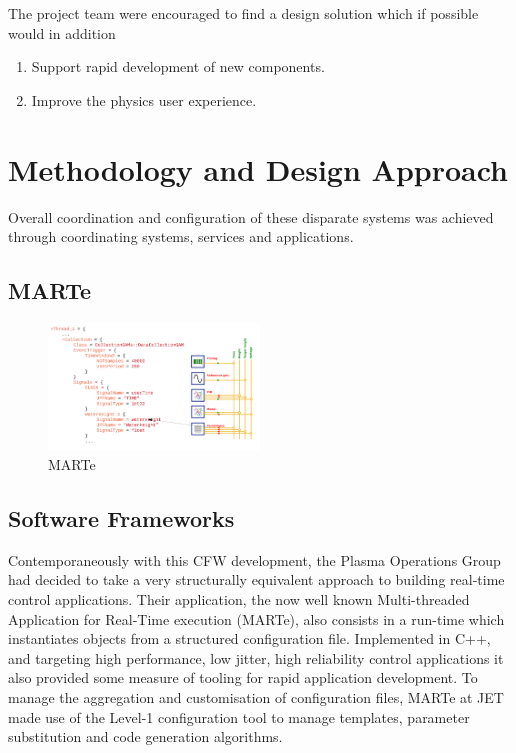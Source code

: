\documentclass[5p]{elsarticle}
\begin{document}
The project team were encouraged to find a design solution which
if possible would in addition

\begin{enumerate}
	\item{Support rapid development of new components.}
	\item{Improve the physics user experience.}
\end{enumerate}

\section{Methodology and Design Approach}



Overall coordination and configuration of these disparate systems was achieved through coordinating systems, services
and applications.

\subsection{MARTe}

\begin{figure}[ht!]%
\centering
\includegraphics[width=0.5\textwidth]{MARTE.PNG}
\caption{MARTe}\label{fig4}
\end{figure}

\subsection{Software Frameworks}

Contemporaneously with this CFW development, the Plasma Operations Group had decided
to take a very structurally equivalent approach to building real-time control applications.
Their application, the now well known Multi-threaded Application for Real-Time execution (MARTe),
also consists in a run-time which instantiates objects from a structured configuration file.
Implemented in C++, and targeting high performance, low jitter, high reliability control
applications it also provided some measure of tooling for rapid application development.
To manage the aggregation and customisation of configuration files, MARTe at JET made
use of the Level-1 configuration tool to manage templates, parameter substitution and
code generation algorithms.
\end{document}
